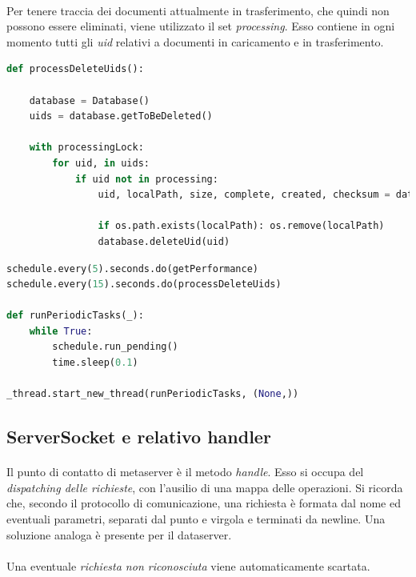 \documentclass[11pt,a4paper,english]{article}
\begin{document}
\paragraph{} Per tenere traccia dei documenti attualmente in trasferimento, che quindi non possono essere eliminati, viene utilizzato il set \emph{processing}. Esso contiene in ogni momento tutti gli \emph{uid} relativi a documenti in caricamento e in trasferimento. 

\begin{lstlisting}[language=Python, title=Eliminazione dei documenti in coda]
def processDeleteUids():

    database = Database()
    uids = database.getToBeDeleted()

    with processingLock:
        for uid, in uids:
            if uid not in processing:
                uid, localPath, size, complete, created, checksum = database.getObject(uid)
                
                if os.path.exists(localPath): os.remove(localPath)
                database.deleteUid(uid)
\end{lstlisting}

\begin{lstlisting}[language=Python, title=Scheduling ed esecuzione]
schedule.every(5).seconds.do(getPerformance)
schedule.every(15).seconds.do(processDeleteUids)

def runPeriodicTasks(_):
    while True:
        schedule.run_pending()
        time.sleep(0.1)

_thread.start_new_thread(runPeriodicTasks, (None,))
\end{lstlisting}


\subsection{ServerSocket e relativo handler}

\paragraph{} Il punto di contatto di metaserver è il metodo \emph{handle}. Esso si occupa del \emph{dispatching delle richieste}, con l'ausilio di una mappa delle operazioni. Si ricorda che, secondo il protocollo di comunicazione, una richiesta è formata dal nome ed eventuali parametri, separati dal punto e virgola e terminati da newline. Una soluzione analoga è presente per il dataserver.

\paragraph{} Una eventuale \emph{richiesta non riconosciuta} viene automaticamente scartata.
\end{document}
